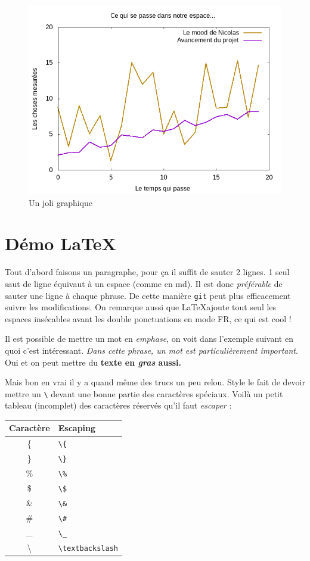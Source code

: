 \documentclass[french]{article}
\begin{document}
\begin{figure}[ht]
    \centering
    \includegraphics[width=1\textwidth]{test}
    \caption{Un joli graphique}
    \label{fig:test}
\end{figure}

\section{Démo \LaTeX}

Tout d'abord faisons un paragraphe, pour ça il suffit de sauter 2 lignes.
1 seul saut de ligne équivaut à un espace (comme en md).
Il est donc \emph{préférable} de sauter une ligne à chaque phrase.
De cette manière \lstinline{git} peut plus efficacement suivre les modifications.
On remarque aussi que \LaTeX ajoute tout seul les espaces insécables avant les double ponctuations en mode FR, ce qui est cool !

Il est possible de mettre un mot en \emph{emphase}, on voit dans l'exemple suivant en quoi c'est intéressant.
\textit{Dans cette phrase, un mot est \emph{particulièrement} important}.
Oui et on peut mettre du \textbf{texte en \emph{gras} aussi.}

Mais bon en vrai il y a quand même des trucs un peu relou.
Style le fait de devoir mettre un \lstinline{\} devant une bonne partie des caractères spéciaux.
Voilà un petit tableau (incomplet) des caractères réservés qu'il faut \emph{escaper} :

\begin{tabular}{ c l }
	Caractère & Escaping \\
	\hline
	\{ & \verb|\{| \\
	\} & \verb|\}| \\
	\% & \verb|\%| \\
	\$ & \verb|\$| \\
	\& & \verb|\&| \\
	\# & \verb|\#| \\
	\_ & \verb|\_| \\
	\textbackslash & \verb|\textbackslash|
\end{tabular}
\end{document}
